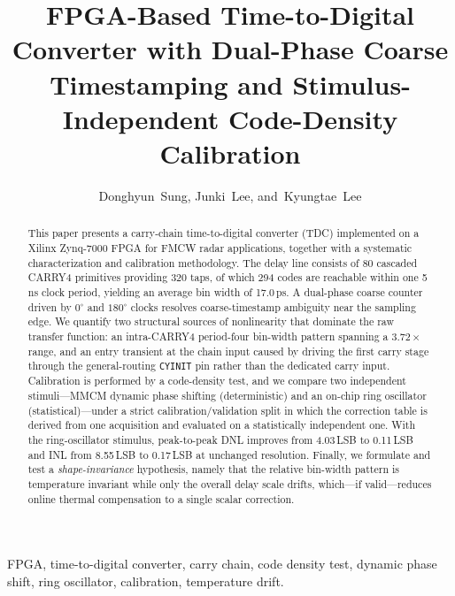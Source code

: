 \documentclass[journal]{IEEEtran}
\begin{document}
\title{FPGA-Based Time-to-Digital Converter with Dual-Phase Coarse
Timestamping and Stimulus-Independent Code-Density Calibration}

\author{Donghyun~Sung, Junki~Lee, and~Kyungtae~Lee}

\maketitle

\begin{abstract}
This paper presents a carry-chain time-to-digital converter (TDC)
implemented on a Xilinx Zynq-7000 FPGA for FMCW radar applications, together
with a systematic characterization and calibration methodology.
The delay line consists of 80 cascaded CARRY4 primitives providing 320 taps,
of which 294 codes are reachable within one 5\,ns clock period, yielding an
average bin width of 17.0\,ps.
A dual-phase coarse counter driven by $0^{\circ}$ and $180^{\circ}$ clocks
resolves coarse-timestamp ambiguity near the sampling edge.
We quantify two structural sources of nonlinearity that dominate the raw
transfer function: an intra-CARRY4 period-four bin-width pattern spanning a
$3.72\times$ range, and an entry transient at the chain input caused by
driving the first carry stage through the general-routing \texttt{CYINIT} pin
rather than the dedicated carry input.
Calibration is performed by a code-density test, and we compare two
independent stimuli---MMCM dynamic phase shifting (deterministic) and an
on-chip ring oscillator (statistical)---under a strict
calibration/validation split in which the correction table is derived from
one acquisition and evaluated on a statistically independent one.
With the ring-oscillator stimulus, peak-to-peak DNL improves from
4.03\,LSB to 0.11\,LSB and INL from 8.55\,LSB to 0.17\,LSB at unchanged
resolution.
Finally, we formulate and test a \emph{shape-invariance} hypothesis, namely
that the relative bin-width pattern is temperature invariant while only the
overall delay scale drifts, which---if valid---reduces online thermal
compensation to a single scalar correction.
\end{abstract}

\begin{IEEEkeywords}
FPGA, time-to-digital converter, carry chain, code density test,
dynamic phase shift, ring oscillator, calibration, temperature drift.
\end{IEEEkeywords}
\end{document}
